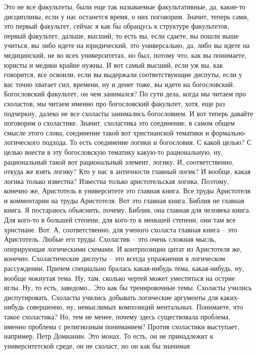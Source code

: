 Это не все факультеты, были еще так называемые факультативные, да, какие-то
дисциплины, если у нас останется время, о них поговорим. Значит, теперь сами,
это первый факультет, сейчас я как бы обращусь к структуре факультетов, первый
факультет, дальше, высший, то есть вы, если сдаете, вы пошли выше учиться, вы
либо идете на юридический, это универсально, да, либо вы идете на медицинский,
не во всех университетах, но был, потому что, как вы понимаете, юристы и медики
крайне нужны. И вот самый высший, если уж вы, как говорится, все освоили, если
вы выдержали соответствующие диспуты, если у вас точно хватает сил, времени, ну
и денег тоже, вы идете на богословский. Богословский факультет, он чем
занимался? По сути дела, когда мы читаем про схоластов, мы читаем именно про
богословский факультет, хотя, еще раз подчеркну, далеко не все схоласты
занимались богословием. И вот теперь давайте поговорим о схоластике. Значит,
схоластика это соединение, в самом общем смысле этого слова, соединение такой
вот христианской тематики и формально-логического подхода. То есть соединение
логики и богословия. С какой целью? С целью внести в эту богословскую тематику
какую-то рациональную, ну, рациональный такой вот рациональный элемент, логику.
И, соответственно, откуда же взять логику? Кто у нас в античности главный логик?
И вообще, какая логика только известна? Известна только аристотельская логика.
Поэтому, конечно же, Аристотель в университете это главная книга. Все труды
Аристотеля и комментарии на труды Аристотеля. Вот это главная книга. Библия не
главная книга. Я постараюсь объяснить, почему. Библия, она главная для человека
книга. Для кого-то в большей степени, для кого-то в меньшей степени, они там все
христиане. Вот. А, соответственно, для ученого схоласта главная книга – это
Аристотель. Любые его труды. Схоластик – это очень сложная мысль, оперирующая
логическими схемами. И контрпозиции цитат из Аристотеля же, конечно.
Схоластические диспуты – это всегда упражнения в логическом рассуждении. Причем
специально бралась какая-нибудь тема, какая-нибудь, ну, вообще чокнутая тема.
Ну, там, сколько чертей может уместиться на острие иглы. Ну, то есть, заведомо…
Это как бы тренировочные темы. Схоласты учились диспутировать. Схоласты учились
добывать логические аргументы для каких-нибудь совершенно, ну, немыслимых
композиций ментальных. Понимаете, что такое схоластика? Но, тем не менее, почему
здесь существовала проблема, именно проблема с религиозным пониманием? Против
схоластики выступает, например, Петр Домианин. Это монах. То есть, он не
принадлежит к университетской среде, он не схоласт, но он как бы значимая
